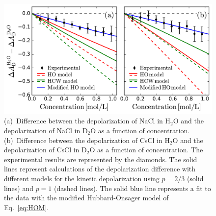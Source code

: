 \begin{figure}[t!]
	\centering
	\includegraphics[width=0.85\figwidth]{chapters/Chapter4_PRL/Graphs/Onsager_Sodium_Caesium_EffectiveKirkwood_with_Fitting.pdf}
	\caption{(a)~Difference between the depolarization of NaCl in H$_2$O and the depolarization of NaCl in D$_2$O as a function of concentration. (b)~Difference between the depolarization of CsCl in H$_2$O and the depolarization of CsCl in D$_2$O as a function of concentration. The experimental results are represented by the diamonds. The solid lines represent calculations of the depolarization difference with different models for the kinetic depolarization using $p=2/3$ (solid lines) and $p=1$ (dashed lines). The solid blue line represents a fit to the data with the modified Hubbard-Onsager model of Eq.~\ref{eq:HOM}.}
	\label{fig3_Chap4}
\end{figure}


